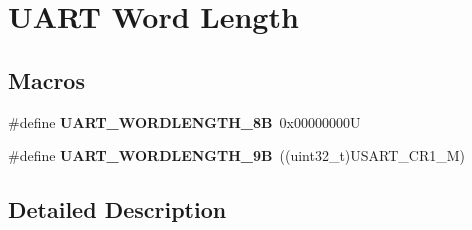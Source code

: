 \hypertarget{group___u_a_r_t___word___length}{}\section{U\+A\+RT Word Length}
\label{group___u_a_r_t___word___length}
\subsection*{Macros}
\begin{DoxyCompactItemize}
\item 
\mbox{\label{group___u_a_r_t___word___length_gaf394e9abaf17932ee89591f990fe6407}} 
\#define {\bfseries U\+A\+R\+T\+\_\+\+W\+O\+R\+D\+L\+E\+N\+G\+T\+H\+\_\+8B}~0x00000000U
\item 
\mbox{\label{group___u_a_r_t___word___length_gaf867be43de35fd3c32fe0b4dd4058f7e}} 
\#define {\bfseries U\+A\+R\+T\+\_\+\+W\+O\+R\+D\+L\+E\+N\+G\+T\+H\+\_\+9B}~((uint32\+\_\+t)U\+S\+A\+R\+T\+\_\+\+C\+R1\+\_\+M)
\end{DoxyCompactItemize}


\subsection{Detailed Description}
